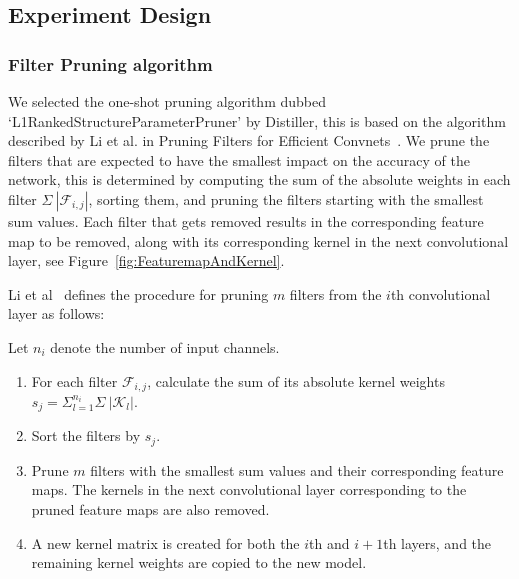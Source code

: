 \documentclass[../Dissertation.tex]{subfiles}
\begin{document}
\newpage

\subsection{Experiment Design}\label{sec:ExperimentDesign}

\subsubsection{Filter Pruning algorithm}\label{sec:FilterPruningAlgo}
We selected the one-shot pruning algorithm dubbed `L1RankedStructureParameterPruner' by Distiller, this is based on the algorithm described by Li et al. in Pruning Filters for Efficient Convnets~\autocite{liPruningFiltersEfficient2017}. 
We prune the filters that are expected to have the smallest impact on the accuracy of the network, this is determined by computing the sum of the absolute weights in each filter $\Sigma~|\mathcal{F}_{i,j}|$, sorting them, and pruning the filters starting with the smallest sum values.
Each filter that gets removed results in the corresponding feature map to be removed, along with its corresponding kernel in the next convolutional layer, see Figure~\ref{fig:FeaturemapAndKernel}. \\


\begin{singlespace}
\noindent Li et al~\autocite{liPruningFiltersEfficient2017} defines the procedure for pruning $m$ filters from the $i$th convolutional layer as follows:

\noindent Let $n_i$ denote the number of input channels.
    \begin{enumerate}
        \item For each filter $\mathcal{F}_{i,j}$, calculate the sum of its absolute kernel weights $s_{j} = \Sigma_{l=1}^{n_{i}}\Sigma~|\mathcal{K}_{l}|$.
        \item Sort the filters by $s_j$.
        \item Prune $m$ filters with the smallest sum values and their corresponding feature maps. The kernels in the next convolutional layer corresponding to the pruned feature maps are also removed.
        \item A new kernel matrix is created for both the $i$th and $i + 1$th layers, and the remaining kernel weights are copied to the new model.
    \end{enumerate}
\end{singlespace}
\end{document}
